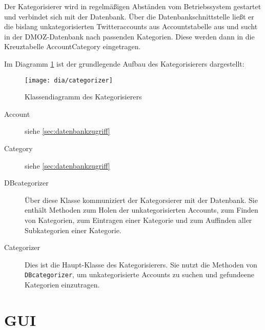 Der Kategorisierer wird in regelmäßigen Abständen vom Betriebssystem gestartet und verbindet sich mit der Datenbank. Über die Datenbankschnittstelle ließt er die bislang unkategorisierten Twitteraccounts aus Accountstabelle aus und sucht in der DMOZ-Datenbank nach passenden Kategorien. Diese werden dann in die Kreuztabelle AccountCategory eingetragen.

Im Diagramm \ref{fig:categorizer} ist der grundlegende Aufbau des Kategorisierers dargestellt:
\begin{figure}[h]
	\texttt{[image: dia/categorizer]}
	\caption{Klassendiagramm des Kategorisierers}
	\label{fig:categorizer}
\end{figure}

\begin{description}
	\item[Account] siehe \cref{sec:datenbankzugriff}
	\item[Category] siehe \cref{sec:datenbankzugriff}
	\item[DBcategorizer] Über diese Klasse kommuniziert der Kategorsierer mit der Datenbank. Sie enthält Methoden zum Holen der unkategorisierten Accounts, zum Finden von Kategorien, zum Eintragen einer Kategorie und zum Auffinden aller Subkategorien einer Kategorie.
	\item[Categorizer] Dies ist die Haupt-Klasse des Kategorisierers. Sie nutzt die Methoden von \lstinline{DBcategorizer}, um unkategorisierte Accounts zu suchen und gefundeene Kategorien einzutragen.
\end{description}

\section{GUI}

